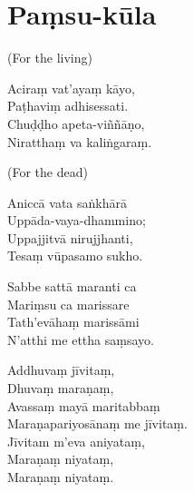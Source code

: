 \chapter{Paṃsu-kūla}

(For the living)

Aciraṃ vat'ayaṃ kāyo,\\
Paṭhaviṃ adhisessati.\\
Chuḍḍho apeta-viññāṇo,\\
Niratthaṃ va kaliṅgaraṃ.

(For the dead)

Aniccā vata saṅkhārā\\
Uppāda-vaya-dhammino;\\
Uppajjitvā nirujjhanti,\\
Tesaṃ vūpasamo sukho.

Sabbe sattā maranti ca\\
Mariṃsu ca marissare\\
Tath'evāhaṃ marissāmi\\
N'atthi me ettha saṃsayo.

Addhuvaṃ jīvitaṃ,\\
Dhuvaṃ maraṇaṃ,\\
Avassaṃ mayā maritabbaṃ\\
Maraṇapariyosānaṃ me jīvitaṃ.\\
Jīvitam m'eva aniyataṃ,\\
Maraṇaṃ niyataṃ,\\
Maraṇaṃ niyataṃ.


